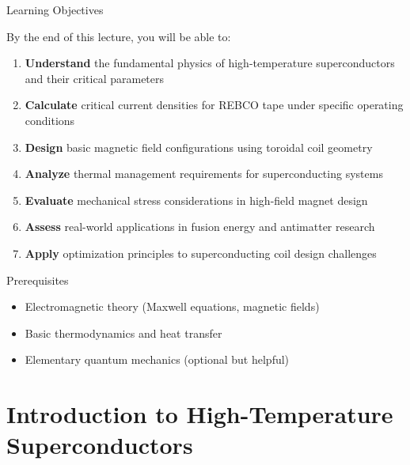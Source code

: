 \documentclass[aspectratio=169,xcolor={table,dvipsnames}]{beamer}
\begin{document}
\begin{frame}{Learning Objectives}
    \begin{block}{By the end of this lecture, you will be able to:}
        \begin{enumerate}
            \item \textbf{Understand} the fundamental physics of high-temperature superconductors and their critical parameters
            \item \textbf{Calculate} critical current densities for REBCO tape under specific operating conditions
            \item \textbf{Design} basic magnetic field configurations using toroidal coil geometry
            \item \textbf{Analyze} thermal management requirements for superconducting systems
            \item \textbf{Evaluate} mechanical stress considerations in high-field magnet design
            \item \textbf{Assess} real-world applications in fusion energy and antimatter research
            \item \textbf{Apply} optimization principles to superconducting coil design challenges
        \end{enumerate}
    \end{block}
    
    \begin{alertblock}{Prerequisites}
        \begin{itemize}
            \item Electromagnetic theory (Maxwell equations, magnetic fields)
            \item Basic thermodynamics and heat transfer
            \item Elementary quantum mechanics (optional but helpful)
        \end{itemize}
    \end{alertblock}
\end{frame}

\section{Introduction to High-Temperature Superconductors}
\end{document}
